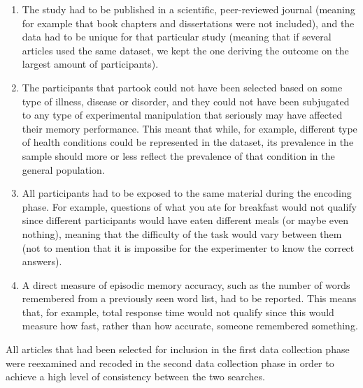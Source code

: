 \begin{enumerate} \item The study had to be published in a scientific, peer-reviewed journal (meaning for example that book chapters and dissertations were not included), and the data had to be unique for that particular study (meaning that if several articles used the same dataset, we kept the one deriving the outcome on the largest amount of participants). \item The participants that partook could not have been selected based on some type of illness, disease or disorder, and they could not have been subjugated to any type of experimental manipulation that seriously may have affected their memory performance. This meant that while, for example, different type of health conditions could be represented in the dataset, its prevalence in the sample should more or less reflect the prevalence of that condition in the general population. \item All participants had to be exposed to the same material during the encoding phase. For example, questions of what you ate for breakfast would not qualify since different participants would have eaten different meals (or maybe even nothing), meaning that the difficulty of the task would vary between them (not to mention that it is impossibe for the experimenter to know the correct answers). \item A direct measure of episodic memory accuracy, such as the number of words remembered from a previously seen word list, had to be reported. This means that, for example, total response time would not qualify since this would measure how fast, rather than how accurate, someone remembered something. \end{enumerate}

All articles that had been selected for inclusion in the first data collection phase were reexamined and recoded in the second data collection phase in order to achieve a high level of consistency between the two searches.

